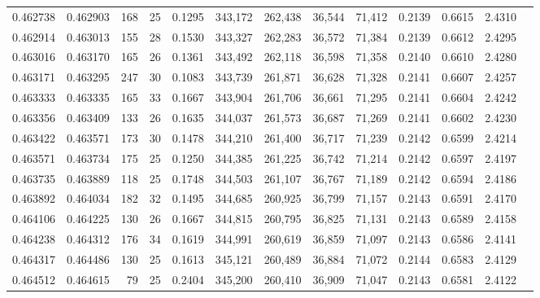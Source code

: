 \begin{tabular}{rrrrrrrrrrrrr}
0.462738 & 0.462903 &    168 &    25 &                                     0.1295 & 343,172 & 262,438 &  36,544 &  71,412 & 0.2139 & 0.6615 & 2.4310 \\
0.462914 & 0.463013 &    155 &    28 &                                     0.1530 & 343,327 & 262,283 &  36,572 &  71,384 & 0.2139 & 0.6612 & 2.4295 \\
0.463016 & 0.463170 &    165 &    26 &                                     0.1361 & 343,492 & 262,118 &  36,598 &  71,358 & 0.2140 & 0.6610 & 2.4280 \\
0.463171 & 0.463295 &    247 &    30 &                                     0.1083 & 343,739 & 261,871 &  36,628 &  71,328 & 0.2141 & 0.6607 & 2.4257 \\
0.463333 & 0.463335 &    165 &    33 &                                     0.1667 & 343,904 & 261,706 &  36,661 &  71,295 & 0.2141 & 0.6604 & 2.4242 \\
0.463356 & 0.463409 &    133 &    26 &                                     0.1635 & 344,037 & 261,573 &  36,687 &  71,269 & 0.2141 & 0.6602 & 2.4230 \\
0.463422 & 0.463571 &    173 &    30 &                                     0.1478 & 344,210 & 261,400 &  36,717 &  71,239 & 0.2142 & 0.6599 & 2.4214 \\
0.463571 & 0.463734 &    175 &    25 &                                     0.1250 & 344,385 & 261,225 &  36,742 &  71,214 & 0.2142 & 0.6597 & 2.4197 \\
0.463735 & 0.463889 &    118 &    25 &                                     0.1748 & 344,503 & 261,107 &  36,767 &  71,189 & 0.2142 & 0.6594 & 2.4186 \\
0.463892 & 0.464034 &    182 &    32 &                                     0.1495 & 344,685 & 260,925 &  36,799 &  71,157 & 0.2143 & 0.6591 & 2.4170 \\
0.464106 & 0.464225 &    130 &    26 &                                     0.1667 & 344,815 & 260,795 &  36,825 &  71,131 & 0.2143 & 0.6589 & 2.4158 \\
0.464238 & 0.464312 &    176 &    34 &                                     0.1619 & 344,991 & 260,619 &  36,859 &  71,097 & 0.2143 & 0.6586 & 2.4141 \\
0.464317 & 0.464486 &    130 &    25 &                                     0.1613 & 345,121 & 260,489 &  36,884 &  71,072 & 0.2144 & 0.6583 & 2.4129 \\
0.464512 & 0.464615 &     79 &    25 &                                     0.2404 & 345,200 & 260,410 &  36,909 &  71,047 & 0.2143 & 0.6581 & 2.4122 \\

\end{tabular}
